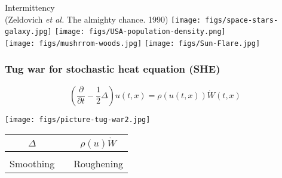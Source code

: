 \documentclass[9pt,xcolor=dvipsnames,table]{beamer}
\begin{document}
\begin{frame}{Intermittency\\ {\small (Zeldovich {\it et al.} The almighty chance. 1990})} %
  \texttt{[image: figs/space-stars-galaxy.jpg]}\hfill
  \texttt{[image: figs/USA-population-density.png]}\\ \vfill
  \texttt{[image: figs/mushrrom-woods.jpg]}\hfill
  \texttt{[image: figs/Sun-Flare.jpg]}
\end{frame}
\begin{frame} %

  \frametitle{Tug war for stochastic heat equation (SHE)}
\[\left(\displaystyle\frac{\partial}{\partial t}
-\frac{1}{2}\Delta \right) u(t,x) =
\rho(u(t,x))  \dot{W}(t,x)\]
\vspace{-1.8em}
 \begin{center}
  \texttt{[image: figs/picture-tug-war2.jpg]}
  \vfill
  \begin{tabular}{ c c c  }
    $\Delta$  &  & $\rho(u)\dot{W}$ \\ [0.5em] \hline \\
    Smoothing &  & Roughening       \\
  \end{tabular}
 \end{center}
\end{frame}
\end{document}

